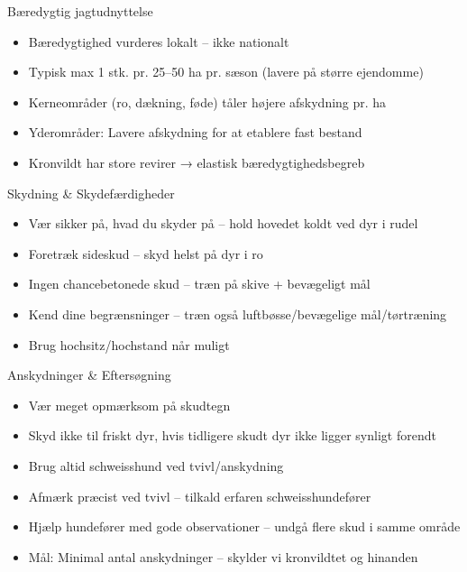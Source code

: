 \begin{frame}{Bæredygtig jagtudnyttelse}
\begin{itemize}
\item Bæredygtighed vurderes lokalt – ikke nationalt
\item Typisk max 1 stk. pr. 25–50 ha pr. sæson (lavere på større ejendomme)
\item Kerneområder (ro, dækning, føde) tåler højere afskydning pr. ha
\item Yderområder: Lavere afskydning for at etablere fast bestand
\item Kronvildt har store revirer → elastisk bæredygtighedsbegreb
\end{itemize}
\end{frame}

\begin{frame}{Skydning \& Skydefærdigheder}
\begin{itemize}
\item Vær sikker på, hvad du skyder på – hold hovedet koldt ved dyr i rudel
\item Foretræk sideskud – skyd helst på dyr i ro
\item Ingen chancebetonede skud – træn på skive + bevægeligt mål
\item Kend dine begrænsninger – træn også luftbøsse/bevægelige mål/tørtræning
\item Brug hochsitz/hochstand når muligt
\end{itemize}
\end{frame}

\begin{frame}{Anskydninger \& Eftersøgning}
\begin{itemize}
\item Vær meget opmærksom på skudtegn
\item Skyd ikke til friskt dyr, hvis tidligere skudt dyr ikke ligger synligt forendt
\item Brug altid schweisshund ved tvivl/anskydning
\item Afmærk præcist ved tvivl – tilkald erfaren schweisshundefører
\item Hjælp hundefører med gode observationer – undgå flere skud i samme område
\item Mål: Minimal antal anskydninger – skylder vi kronvildtet og hinanden
\end{itemize}
\end{frame}

